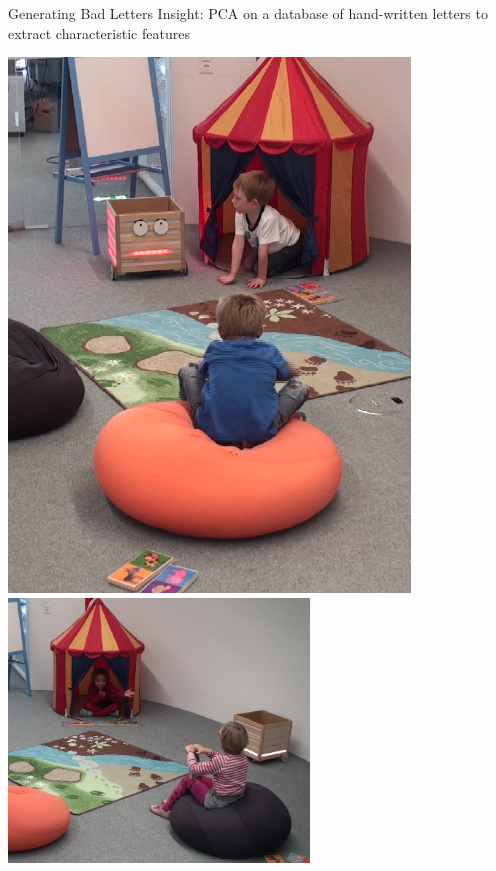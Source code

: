\documentclass[compress]{beamer}
\begin{document}


\begin{frame}{Generating Bad Letters}
    \centering
     {
    Insight: PCA on a database of hand-written letters to extract characteristic features
    }

     {
    \includegraphics[width=0.8\textwidth]{domino-disobey}
    }
     {
    \includegraphics[width=0.6\textwidth]{domino-lost}
    }
\end{frame}
\end{document}
